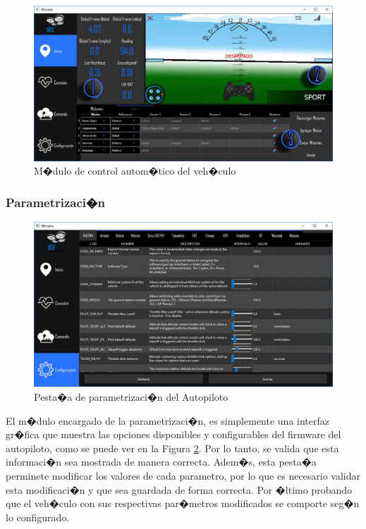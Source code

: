 \begin{itemize}
	\begin{figure}[h!]
		\centering
		\includegraphics[width=0.7\linewidth, height=0.17\textheight]{Imagenes/pINICIO_a}
		\caption{M�dulo de control autom�tico del veh�culo}
		\label{fig:pinicioa}
	\end{figure}
	
	
	
\end{itemize}

\subsubsection{Parametrizaci�n}

\begin{figure}[h!]
	\centering
	\includegraphics[width=0.7\linewidth, height=0.2\textheight]{Imagenes/pestConfig}
	\caption{Pesta�a de parametrizaci�n del Autopiloto}
	\label{fig:pestconfig}
\end{figure}


El m�dulo encargado de la parametrizaci�n, es simplemente una interfaz gr�fica que muestra las opciones disponibles y configurables del firmware del autopiloto, como se puede ver en la Figura \ref{fig:pestconfig}. Por lo tanto, se valida que esta informaci�n sea mostrada de manera correcta. Adem�s, esta pesta�a perminete modificar los valores de cada parametro, por lo que es necesario validar esta modificaci�n y que sea guardada de forma correcta. Por �ltimo probando que el veh�culo con sus respectivas par�metros modificados se comporte seg�n lo configurado.



